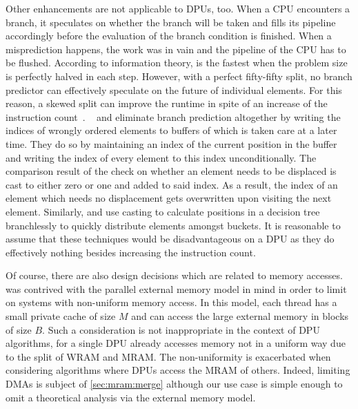 Other enhancements are not applicable to \acp{DPU}, too.
When a \ac{CPU} encounters a branch, it speculates on whether the branch will be taken and fills its pipeline accordingly before the evaluation of the branch condition is finished.
When a misprediction happens, the work was in vain and the pipeline of the \ac{CPU} has to be flushed.
According to information theory, \QS{} is the fastest when the problem size is perfectly halved in each step.
However, with a perfect fifty-fifty split, no branch predictor can effectively speculate on the future of individual elements.
For this reason, a skewed split can improve the runtime in spite of an increase of the instruction count~\cite{kaligosi2009misprediction}.
\BQS{}~\cite{edelkamp2016misprediction} and \IPSo{} eliminate branch prediction altogether by writing the indices of wrongly ordered elements to buffers of which is taken care at a later time.
They do so by maintaining an index of the current position in the buffer and writing the index of every element to this index unconditionally.
The comparison result of the check on whether an element needs to be displaced is cast to either zero or one and added to said index.
As a result, the index of an element which needs no displacement gets overwritten upon visiting the next element.
Similarly, \IPSo{} and \SSSSS{} use casting to calculate positions in a decision tree branchlessly to quickly distribute elements amongst buckets.
It is reasonable to assume that these techniques would be disadvantageous on a \ac{DPU} as they do effectively nothing besides increasing the instruction count.

Of course, there are also design decisions which are related to memory accesses.
\IPSo{} was contrived with the parallel external memory model in mind in order to limit  on systems with non-uniform memory access.
In this model, each thread has a small private cache of size \(M\) and can access the large external memory in blocks of size \(B\).
Such a consideration is not inappropriate in the context of \ac{DPU} algorithms, for a single \ac{DPU} already accesses memory not in a uniform way due to the split of \ac{WRAM} and \ac{MRAM}.
The non-uniformity is exacerbated when considering algorithms where \acp{DPU} access the \ac{MRAM} of others.
Indeed, limiting \acp{DMA} is subject of \cref{sec:mram:merge} although our use case is simple enough to omit a theoretical analysis via the external memory model.
